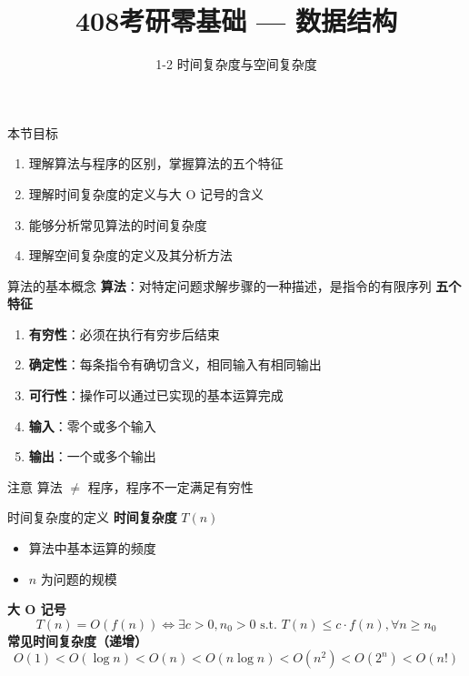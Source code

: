 \documentclass[10pt, aspectratio=169]{beamer}
\title{408考研零基础 --- 数据结构}
\subtitle{1-2 时间复杂度与空间复杂度}
\author{}
\date{}
\begin{document}
\begin{frame}{本节目标}
    \begin{enumerate}
        \item 理解算法与程序的区别，掌握算法的五个特征
        \item 理解时间复杂度的定义与大 O 记号的含义
        \item 能够分析常见算法的时间复杂度
        \item 理解空间复杂度的定义及其分析方法
    \end{enumerate}
\end{frame}

\begin{frame}{算法的基本概念}
    \textbf{算法}：对特定问题求解步骤的一种描述，是指令的有限序列
    \vspace{0.5em}
    \textbf{五个特征}
    \begin{enumerate}
        \item \textbf{有穷性}：必须在执行有穷步后结束
        \item \textbf{确定性}：每条指令有确切含义，相同输入有相同输出
        \item \textbf{可行性}：操作可以通过已实现的基本运算完成
        \item \textbf{输入}：零个或多个输入
        \item \textbf{输出}：一个或多个输出
    \end{enumerate}
    \vspace{0.5em}
    \begin{block}{注意}
        算法 $\neq$ 程序，程序不一定满足有穷性
    \end{block}
\end{frame}

\begin{frame}{时间复杂度的定义}
    \textbf{时间复杂度} $T(n)$
    \begin{itemize}
        \item 算法中基本运算的频度
        \item $n$ 为问题的规模
    \end{itemize}
    \vspace{0.5em}
    \textbf{大 O 记号}
    \[
    T(n) = O(f(n)) \iff \exists c > 0, n_0 > 0 \text{ s.t. } T(n) \le c\cdot f(n), \forall n \ge n_0
    \]
    \vspace{0.5em}
    \textbf{常见时间复杂度（递增）}
    \[
    O(1) < O(\log n) < O(n) < O(n\log n) < O(n^2) < O(2^n) < O(n!)
    \]
\end{frame}
\end{document}
